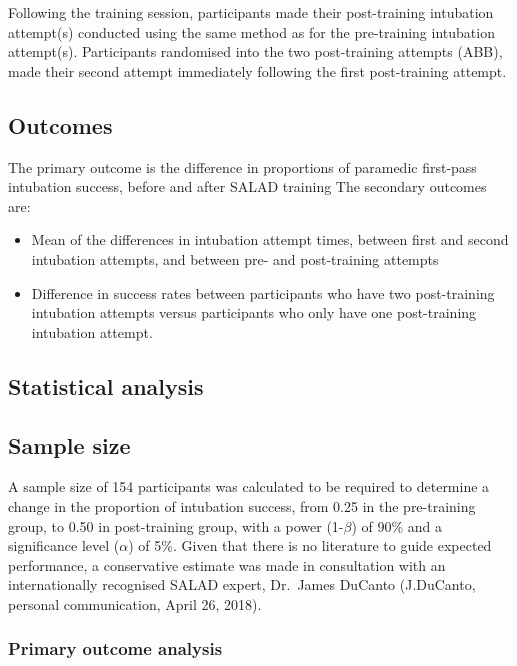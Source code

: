 \documentclass[]{article}
\providecommand{\tightlist}{%
  \setlength{\itemsep}{0pt}\setlength{\parskip}{0pt}}
\begin{document}
Following the training session, participants made their post-training
intubation attempt(s) conducted using the same method as for the
pre-training intubation attempt(s). Participants randomised into the two
post-training attempts (ABB), made their second attempt immediately
following the first post-training attempt.

\hypertarget{outcomes}{%
\subsection{Outcomes}\label{outcomes}}

The primary outcome is the difference in proportions of paramedic
first-pass intubation success, before and after SALAD training The
secondary outcomes are:

\begin{itemize}
\tightlist
\item
  Mean of the differences in intubation attempt times, between first and
  second intubation attempts, and between pre- and post-training
  attempts
\item
  Difference in success rates between participants who have two
  post-training intubation attempts versus participants who only have
  one post-training intubation attempt.
\end{itemize}

\hypertarget{statistical-analysis}{%
\subsection{Statistical analysis}\label{statistical-analysis}}

\hypertarget{sample-size}{%
\subsection{Sample size}\label{sample-size}}

A sample size of 154 participants was calculated to be required to
determine a change in the proportion of intubation success, from 0.25 in
the pre-training group, to 0.50 in post-training group, with a power
(1-\(\beta\)) of 90\% and a significance level (\(\alpha\)) of 5\%.
Given that there is no literature to guide expected performance, a
conservative estimate was made in consultation with an internationally
recognised SALAD expert, Dr.~James DuCanto (J.DuCanto, personal
communication, April 26, 2018).

\hypertarget{primary-outcome-analysis}{%
\subsubsection{Primary outcome
analysis}\label{primary-outcome-analysis}}
\end{document}

